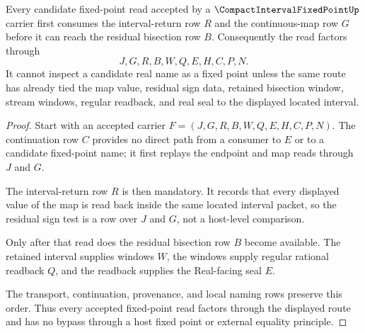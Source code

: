 \begin{theorem}
\label{thm:compact-interval-fixed-point-interval-return-route}
Every candidate fixed-point read accepted by a $\CompactIntervalFixedPointUp$ carrier first consumes the interval-return row $R$ and the continuous-map row $G$ before it can reach the residual bisection row $B$. Consequently the read factors through
$$
J,G,R,B,W,Q,E,H,C,P,N .
$$
It cannot inspect a candidate real name as a fixed point unless the same route has already tied the map value, residual sign data, retained bisection window, stream windows, regular readback, and real seal to the displayed located interval.
\end{theorem}
\begin{proof}
Start with an accepted carrier $F=(J,G,R,B,W,Q,E,H,C,P,N)$. The continuation row $C$ provides no direct path from a consumer to $E$ or to a candidate fixed-point name; it first replays the endpoint and map reads through $J$ and $G$.

The interval-return row $R$ is then mandatory. It records that every displayed value of the map is read back inside the same located interval packet, so the residual sign test is a row over $J$ and $G$, not a host-level comparison.

Only after that read does the residual bisection row $B$ become available. The retained interval supplies windows $W$, the windows supply regular rational readback $Q$, and the readback supplies the Real-facing seal $E$.

The transport, continuation, provenance, and local naming rows preserve this order. Thus every accepted fixed-point read factors through the displayed route and has no bypass through a host fixed point or external equality principle.
\end{proof}


